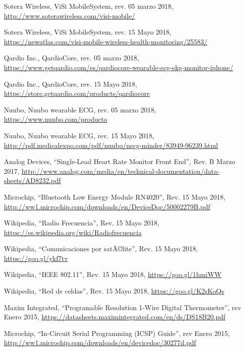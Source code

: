 \renewcommand{\refname}{Referencias}
\begin{thebibliography}{99}

 Sotera Wireless, ViSi Mobile\textregistered  System, rev. 05 marzo 2018, \hyperref[visi]{http://www.soterawireless.com/visi-mobile/}

 Sotera Wireless, ViSi Mobile\textregistered  System, rev. 15 Mayo 2018, \hyperref[visi_tel]{https://newatlas.com/visi-mobile-wireless-health-monitoring/25583/}

 Qardio Inc., QardioCore, rev.  05 marzo 2018, \hyperref[qardio]{https://www.getqardio.com/es/qardiocore-wearable-ecg-ekg-monitor-iphone/}

 Qardio Inc., QardioCore, rev.  15 Mayo 2018,
\hyperref[qardio_tel]{https://store.getqardio.com/products/qardiocore}

 Nuubo, Nuubo wearable ECG, rev. 05 marzo 2018, \hyperref[nuubo]{https://www.nuubo.com/producto}

 Nuubo, Nuubo wearable ECG, rev. 15 Mayo 2018, \hyperref[nuubo_tel]{http://pdf.medicalexpo.com/pdf/nuubo/necg-minder/83949-96239.html}

 Analog Devices, ``Single-Lead Heart Rate Monitor Front End'', Rev. B Marzo 2017, \hyperref[ad8232]{http://www.analog.com/media/en/technical-documentation/data-sheets/AD8232.pdf}

 Microchip, ``Bluetooth Low Energy Module RN4020'', Rev. 15 Mayo 2018, \hyperref[RN4020]{http://ww1.microchip.com/downloads/en/DeviceDoc/50002279B.pdf}

 Wikipedia, ``Radio Frecuencia'', Rev. 15 Mayo 2018, \hyperref[RF]{https://es.wikipedia.org/wiki/Radiofrecuencia}

 Wikipedia, ``Comunicaciones por satÃ©lite'', Rev. 15 Mayo 2018, \hyperref[satelite]{https://goo.gl/ykf7tv}

 Wikipedia, ``IEEE 802.11'', Rev. 15 Mayo 2018, \hyperref[wifi]{https://goo.gl/1hmiWW}

 Wikipedia, ``Red de celdas'', Rev. 15 Mayo 2018, \hyperref[celular]{https://goo.gl/K2sKoQs}

 Maxim Integrated, ``Programable Resolution 1-Wire Digital Thermometer'', rev Enero 2015, \hyperref[temp]{https://datasheets.maximintegrated.com/en/ds/DS18B20.pdf}

 Microchip, ``In-Circuit Serial Programming (ICSP) Guide'', rev Enero 2015, \hyperref[temp]{http://ww1.microchip.com/downloads/en/devicedoc/30277d.pdf}


\end{thebibliography}
